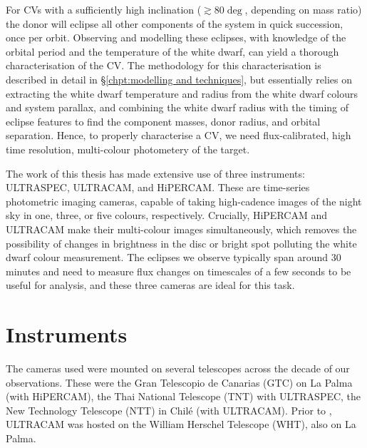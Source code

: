 
\label{chpt:observations and observational techniques} %

For CVs with a sufficiently high inclination ($\gtrsim 80 \deg$, depending on mass ratio) the donor will eclipse all other components of the system in quick succession, once per orbit. Observing and modelling these eclipses, with knowledge of the orbital period and the temperature of the white dwarf, can yield a thorough characterisation of the CV. The methodology for this characterisation is described in detail in \S\ref{chpt:modelling and techniques}, but essentially relies on extracting the white dwarf temperature and radius from the white dwarf colours and system parallax, and combining the white dwarf radius with the timing of eclipse features to find the component masses, donor radius, and orbital separation. Hence, to properly characterise a CV, we need flux-calibrated, high time resolution, multi-colour photometery of the target. 

The work of this thesis has made extensive use of three instruments: ULTRASPEC, ULTRACAM, and HiPERCAM.
These are time-series photometric imaging cameras, capable of taking high-cadence images of the night sky in one, three, or five colours, respectively. Crucially, HiPERCAM and ULTRACAM make their multi-colour images simultaneously, which removes the possibility of changes in brightness in the disc or bright spot polluting the white dwarf colour measurement. The eclipses we observe typically span around 30 minutes and need to measure flux changes on timescales of a few seconds to be useful for analysis, and these three cameras are ideal for this task.


\section{Instruments}

The cameras used were mounted on several telescopes across the decade of our observations. These were the Gran Telescopio de Canarias (GTC) on La Palma (with HiPERCAM), the Thai National Telescope (TNT) with ULTRASPEC, the New Technology Telescope (NTT) in Chil\'e (with ULTRACAM). Prior to , ULTRACAM was hosted on the William Herschel Telescope (WHT), also on La Palma. 


